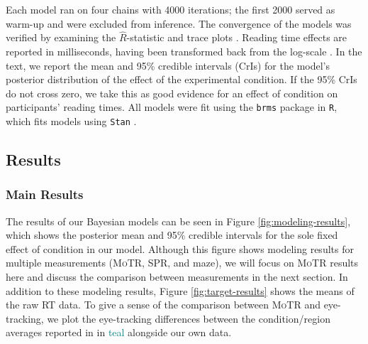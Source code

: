 \documentclass[12pt]{article}
\newcommand{\motr}{\textsc{MoTR}\xspace}
\begin{document}
{Each model ran on four chains with 4000 iterations; the first 2000 served as warm-up and were excluded from inference. The convergence of the models was verified by examining the \(\hat{R}\)-statistic and trace plots \citep{gelman1995bayesian}. Reading time effects are reported in milliseconds, having been transformed back from the log-scale \citep{nicenboim2021introduction}.
In the text, we report the mean and 95\% credible intervals (CrIs)  for the model's posterior distribution of the effect of the experimental condition. If the 95\% CrIs do not cross zero, we take this as good evidence for an effect of condition on participants' reading times.
All models were fit using the \texttt{brms} package \citep{burkner2017brms} in \texttt{R}, which fits models using \texttt{Stan} \citep{carpenter2017stan}.


\subsection{Results}

\subsubsection{Main Results}

\newcommand{\stats}[3]{$\beta=$#1 [#2, #3]\xspace}


The results of our Bayesian models can be seen in Figure \ref{fig:modeling-results}, which shows the posterior mean and 95\% credible intervals for the sole fixed effect of condition in our model. Although this figure shows modeling results for multiple measurements (\motr, SPR, and maze), we will focus on \motr results here and discuss the comparison between measurements in the next section. In addition to these modeling results, Figure \ref{fig:target-results} shows the means of the raw RT data. To give a sense of the comparison between \motr and eye-tracking, we plot the eye-tracking differences between the condition/region averages reported in \citet{witzel2012maze} in \textcolor{teal}{teal} alongside our own data.


}
\end{document}
